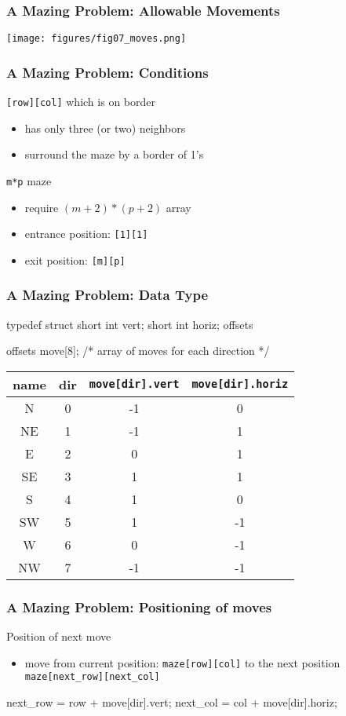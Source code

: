 \documentclass[newPxFont,sthlmFooter,nooffset]{beamer}
\begin{document}
\begin{frame}[t]
  \frametitle{A Mazing Problem: Allowable Movements}
\texttt{[image: figures/fig07\_moves.png]}
\end{frame}

\begin{frame}[t]
  \frametitle{A Mazing Problem: Conditions}
\texttt{[row][col]} which is on border
\begin{itemize}
\item has only three (or two) neighbors
\item surround the maze by a border of 1's
\end{itemize}

\bigskip
\texttt{m*p} maze
\begin{itemize}
\item require $(m+2) *(p+2)$ array
\item entrance position: \texttt{[1][1]}
\item exit position: \texttt{[m][p]}
\end{itemize}
\end{frame}

\begin{frame}[t, fragile]
  \frametitle{A Mazing Problem: Data Type}
\begin{ncodedef}
typedef struct {
    short int vert;
    short int horiz;
} offsets

offsets move[8]; /* array of moves for each direction */    
\end{ncodedef}

\begin{tabular}{c | c | c | c}
  name & dir & \texttt{move[dir].vert} & \texttt{move[dir].horiz} \\ \hline
N  &  0 & -1 &  0 \\
NE &  1 & -1 &  1 \\
E  &  2 &  0 &  1 \\
SE &  3 &  1 &  1 \\
S  &  4 &  1 &  0 \\
SW &  5 &  1 &  -1 \\
W  &  6 &  0 &  -1 \\
NW &  7 & -1 &  -1 \\
\end{tabular}
\end{frame}

\begin{frame}[t, fragile]
  \frametitle{A Mazing Problem: Positioning of moves}
Position of next move
\begin{itemize}
\item move from current position: \texttt{maze[row][col]} to the next position \texttt{maze[next\_row][next\_col]}
\end{itemize}
\begin{ncodedef}
next_row = row + move[dir].vert;
next_col = col + move[dir].horiz;
\end{ncodedef}
\end{frame}
\end{document}
